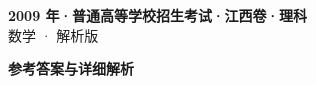 \documentclass[zihao=-4, a4paper]{ctexart}
\begin{document}
\begin{center}
  {\Large\bfseries 2009 年·普通高等学校招生考试·江西卷·理科}\\[4pt]
  {\large 数学 · 解析版}
\end{center}
\medskip
{}

\clearpage
{}
\begin{center}{\Large\bfseries 参考答案与详细解析}\end{center}
\medskip

\end{document}
